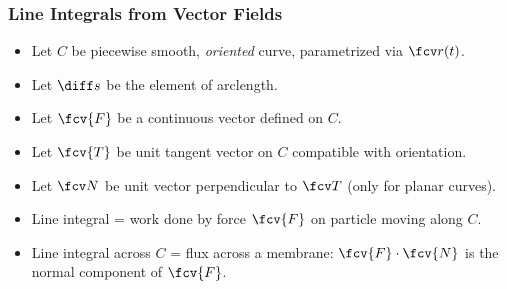 \begin{frame}
\frametitle{Line Integrals from Vector Fields}
\begin{itemize}
\item Let $C$ be piecewise smooth, \emph{oriented} curve, parametrized via $\fcv r(t)$.
\item<2-> Let $\diff s$ be the element of arclength.
\item<3-> Let $\fcv{F}$ be a continuous vector defined on $C$.
\item<4-> Let $\fcv{T}$ be unit tangent vector on $C$ compatible with orientation.
\item<5-> Let $\fcv N$ be unit vector perpendicular to $\fcv T$ (only for planar curves).
\item<8-> Line integral = work done by force $\fcv{F}$ on particle moving along $C$.
\item<9-> Line integral across $C$ = flux across a membrane: $\fcv{F}\cdot \fcv{N}$ is the normal component of $\fcv{F}$.
 \end{itemize}

\end{frame}